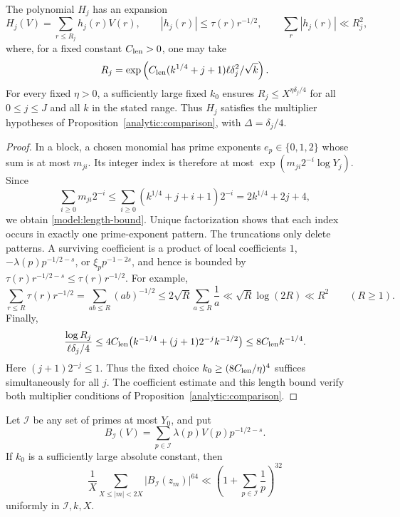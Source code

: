 \begin{lemma}\label{model:mollifier-length}
The polynomial $H_j$ has an expansion
\[
 H_j(V)=\sum_{r\le R_j}h_j(r)V(r),\qquad
 |h_j(r)|\le\tau(r)r^{-1/2},\qquad
 \sum_r|h_j(r)|\ll R_j^2,
\]
where, for a fixed constant $C_{\rm len}>0$, one may take
\begin{equation}
 R_j=\exp\left(C_{\rm len}(k^{1/4}+j+1)
                     \ell\delta_j^2/\sqrt k\right).
 \label{model:length-bound}
\end{equation}
For every fixed $\eta>0$, a sufficiently large fixed $k_0$ ensures
$R_j\le X^{\eta\delta_j/4}$ for all $0\le j\le J$ and all $k$ in
the stated range.  Thus $H_j$ satisfies the multiplier hypotheses of
Proposition~\ref{analytic:comparison}, with $\Delta=\delta_j/4$.
\end{lemma}

\begin{proof}
In a block, a chosen monomial has prime exponents $e_p\in\{0,1,2\}$
whose sum is at most $m_{ji}$.  Its integer index is therefore at most
$\exp(m_{ji}2^{-i}\log Y_j)$.  Since
\[
 \sum_{i\ge0}m_{ji}2^{-i}
 \le\sum_{i\ge0}(k^{1/4}+j+i+1)2^{-i}
 =2k^{1/4}+2j+4,
\]
we obtain \eqref{model:length-bound}.
Unique factorization shows that each index occurs in exactly one
prime-exponent pattern.  The truncations only delete patterns.  A
surviving coefficient is a product of local coefficients $1$,
$-\lambda(p)p^{-1/2-s}$, or $\xi_pp^{-1-2s}$, and hence is bounded by
$\tau(r)r^{-1/2-s}\le\tau(r)r^{-1/2}$.  For example,
\[
 \sum_{r\le R}\tau(r)r^{-1/2}
 =\sum_{ab\le R}(ab)^{-1/2}
 \le2\sqrt R\sum_{a\le R}\frac1a
 \ll\sqrt R\log(2R)\ll R^2\qquad(R\ge1).
\]
Finally,
\[
 \frac{\log R_j}{\ell\delta_j/4}
 \le4C_{\rm len}\bigl(k^{-1/4}+(j+1)2^{-j}k^{-1/2}\bigr)
 \le8C_{\rm len}k^{-1/4}.
\]
Here $(j+1)2^{-j}\le1$. Thus the fixed choice
$k_0\ge(8C_{\rm len}/\eta)^4$ suffices simultaneously for all $j$.
The coefficient estimate and this length bound verify both multiplier
conditions of Proposition~\ref{analytic:comparison}.
\end{proof}

\begin{lemma}
\label{model:integer-moments}
Let $\mathcal I$ be any set of primes at most $Y_0$, and put
\[
 B_{\mathcal I}(V)=\sum_{p\in\mathcal I}
                 \lambda(p)V(p)p^{-1/2-s}.
\]
If $k_0$ is a sufficiently large absolute constant, then
\begin{equation}
 \frac1X\sum_{X\le|m|<2X}|B_{\mathcal I}(z_m)|^{64}
 \ll\left(1+\sum_{p\in\mathcal I}\frac1p\right)^{32}
 \label{model:64th-moment}
\end{equation}
uniformly in $\mathcal I,k,X$.
\end{lemma}


